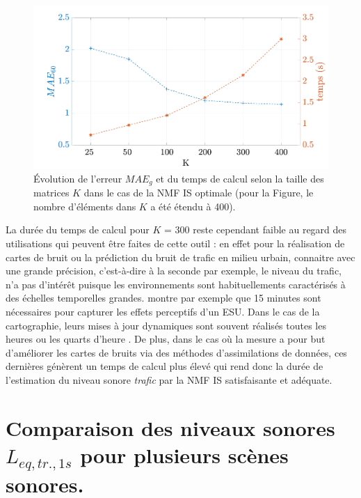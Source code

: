 \begin{figure}
\centering
\includegraphics[width=.7\linewidth]{./figures/resultats/timeErrorNMF_IS_K.pdf}
\caption{Évolution de l'erreur $MAE_g$ et du temps de calcul selon la taille des matrices $K$ dans le cas de la NMF IS optimale (pour la Figure, le nombre d'éléments dans $K$ a été étendu à 400).} 
\label{fig:errorTime}
\end{figure}

La durée du temps de calcul pour $K$ = 300 reste cependant faible au regard des utilisations qui peuvent être faites de cette outil : en effet pour la réalisation de cartes de bruit ou la prédiction du bruit de trafic en milieu urbain, connaitre avec une grande précision, c'est-à-dire à la seconde par exemple, le niveau du trafic, n'a pas d'intérêt puisque les environnements sont habituellements caractérisés à des échelles temporelles grandes. \cite{brocolini2013measurements} montre par exemple que 15 minutes sont nécessaires pour capturer les effets perceptifs d'un ESU. Dans le cas de la cartographie, leurs mises à jour dynamiques sont souvent réalisés toutes les heures \cite{bellucci_life_2017} ou les quarts d'heure \cite{wei_dynamic_2016}. De plus, dans le cas où la mesure a pour but d'améliorer les cartes de bruits via des méthodes d'assimilations de données, ces dernières génèrent un temps de calcul plus élevé qui rend donc la durée de l'estimation du niveau sonore \textit{trafic} par la NMF IS satisfaisante et adéquate.

\section{Comparaison des niveaux sonores $L_{eq,tr.,1s}$ pour plusieurs scènes sonores.}

